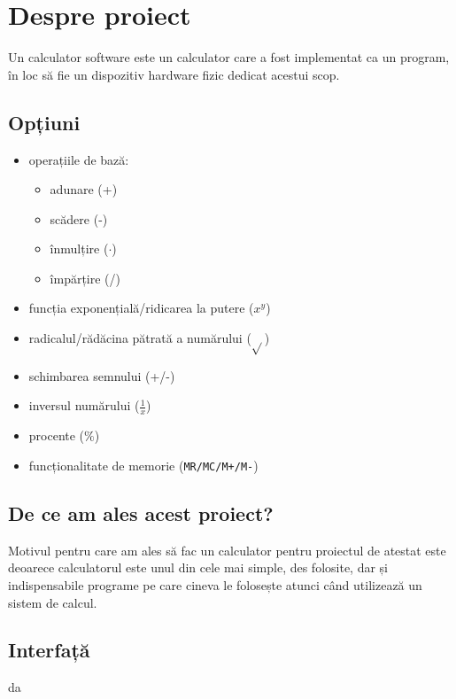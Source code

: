 \section{Despre proiect}
Un calculator software este un calculator care a fost implementat ca un program, în loc să fie un dispozitiv hardware fizic dedicat acestui scop.

\subsection{Opțiuni}
\begin{itemize}
 \item operațiile de bază:
 \begin{itemize}
  \item adunare (+)
  \item scădere (-)
  \item înmulțire ($\cdot$)
  \item împărțire (/)
 \end{itemize}
\item funcția exponențială/ridicarea la putere ($x^y$)
\item radicalul/rădăcina pătrată a numărului ($\sqrt{}$)
\item schimbarea semnului (+/-)
\item inversul numărului ($\frac{1}{x}$)
\item procente ($\%$)
\item funcționalitate de memorie (\texttt{MR/MC/M+/M-})
\end{itemize}


\subsection{De ce am ales acest proiect?}
Motivul pentru care am ales să fac un calculator pentru proiectul de atestat este deoarece calculatorul este unul din cele mai simple, des folosite, dar și indispensabile programe pe care cineva le folosește atunci când utilizează un sistem de calcul.


\subsection{Interfață}
da
